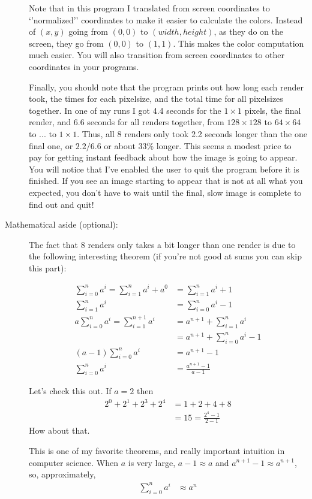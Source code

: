 \documentclass[12pt]{article}
\begin{document}
\begin{description}
Note that in this program I translated from screen coordinates
to `'normalized'' coordinates to make it easier to calculate
the colors.  Instead of $(x,y)$ going from $(0,0)$ to
$(width,height)$, as they do on the screen, they
go from $(0,0)$ to $(1,1)$.  This makes the color
computation much easier.  You will also transition
from screen coordinates to other coordinates in your
programs.

Finally, you should note that the program prints out
how long each render took, the times for each pixelsize,
and the total time for all pixelsizes together.
In one of my runs I got 4.4 seconds for the $1\times 1$
pixels, the final render, and 6.6 seconds for 
all renders together, from $128\times 128$ to 
$64\times 64$ to ... to $1\times 1$.
Thus, all 8 renders only took 2.2 seconds longer
than the one final one, or $2.2/6.6$ or about
33\% longer.  This seems a modest price to pay
for getting instant feedback about how the image
is going to appear.  You will notice that I've
enabled the user to quit the program before it
is finished.  If you see an image starting to
appear that is not at all what you expected,
you don't have to wait until the final, slow
image is complete to find out and quit!

\item[Mathematical aside (optional):]
The fact that 8
 renders only takes a bit longer
than one render is due to the following interesting
theorem (if you're not good at sums you can skip
this part):

\begin{align*}
\sum_{i=0}^n a^i = \sum_{i=1}^{n} a^i + a^0 &= \sum_{i=1}^{n} a^i + 1\\
\sum_{i=1}^{n}a^i &= \sum_{i=0}^{n} a^i - 1\\
a \sum_{i=0}^{n} a^i = \sum_{i=1}^{n+1} a^i &= a^{n+1} + \sum_{i=1}^{n} a^i  \\
               &= a^{n+1} + \sum_{i=0}^n a^i - 1   \\
(a-1)     \sum_{i=0}^n a^i  &= a^{n+1} -1\\
 \sum_{i=0}^n a^i  &= \frac{a^{n+1} -1}{a-1}       
\end{align*}      

Let's check this out.  If $a=2$ then
\begin{align*}
 2^0 + 2^1 + 2^3 + 2^4    &= 1 + 2 + 4+ 8\\
 &= 15= \frac{2^4-1}{2-1}
\end{align*} 
How about that.  

This is one of my favorite theorems, and really
important intuition in computer science.
When $a$ is very large,  $a - 1 \approx a$
and $a^{n+1} - 1 \approx a^{n+1}$, so, approximately,
\begin{align*}
\sum_{i=0}^{n} a^i &\approx a^n
\end{align*} 


\end{description}
\end{document}
